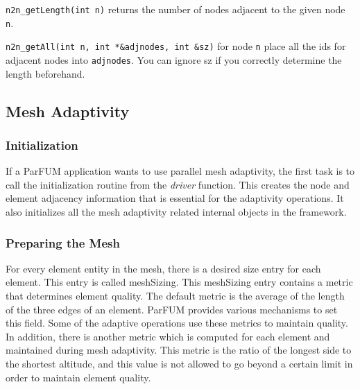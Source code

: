 \begin{list}{-}{}
\item \texttt{n2n\_getLength(int n)} returns the number of nodes adjacent to the given node \texttt{n}.
\item \texttt{n2n\_getAll(int n, int *\&adjnodes, int \&sz)} for node \texttt{n} place all the ids for adjacent nodes into \texttt{adjnodes}. You can ignore sz if you correctly determine the length beforehand.
\end{list}




\subsection{Mesh Adaptivity\label{Subsection-Mesh-Adaptivity}}


\subsubsection{Initialization}
If a ParFUM application wants to use parallel mesh adaptivity,
the first task is to call the initialization routine from the 
{\it driver} function. This creates the node and element 
adjacency information that is essential for the adaptivity 
operations. It also initializes all the mesh adaptivity related
internal objects in the framework.


\subsubsection{Preparing the Mesh}
For every element entity in the mesh, there is a desired size entry 
for each element. This entry is called meshSizing. This meshSizing entry 
contains a metric that determines element quality. The default metric is
the average of the length of the three edges of an element. ParFUM provides 
various mechanisms to set this field. Some of the adaptive operations
use these metrics to maintain quality. In addition, there is another metric
which is computed for each element and maintained during mesh adaptivity. This metric 
is the ratio of the longest side to the shortest altitude, and this value 
is not allowed to go beyond a certain limit in order to maintain element quality.


